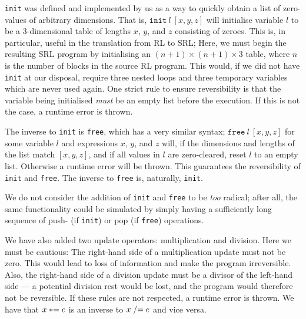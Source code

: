 \texttt{init} was defined and implemented by us as a way to quickly obtain a list of zero-values of arbitrary dimensions. That is, $\texttt{init} \ l \ [x,y,z]$ will initialise variable $l$ to be a 3-dimensional table of lengths $x$, $y$, and $z$ consisting of zeroes. This is, in particular, useful in the translation from RL to SRL; Here, we must begin the resulting SRL program by initialising an $(n+1) \times (n+1) \times 3$ table, where $n$ is the number of blocks in the source RL program. This would, if we did not have \texttt{init} at our disposal, require three nested loops and three temporary variables which are never used again. One strict rule to ensure reversibility is that the variable being initialised \textit{must} be an empty list before the execution. If this is not the case, a runtime error is thrown.

The inverse to \texttt{init} is \texttt{free}, which has a very similar syntax; $\texttt{free} \ l \ [x,y,z]$ for some variable $l$ and expressions $x$, $y$, and $z$ will, if the dimensions and lengths of the list match $[x,y,z]$, and if all values in $l$ are zero-cleared, reset $l$ to an empty list. Otherwise a runtime error will be thrown. This guarantees the reversibility of \texttt{init} and \texttt{free}. The inverse to \texttt{free} is, naturally, \texttt{init}.

We do not consider the addition of \texttt{init} and \texttt{free} to be \textit{too} radical; after all, the same functionality could be simulated by simply having a sufficiently long sequence of push- (if \texttt{init}) or pop (if \texttt{free}) operations.

We have also added two update operators: multiplication and division. Here we must be cautious: The right-hand side of a multiplication update must not be zero. This would lead to loss of information and make the program irreversible. Also, the right-hand side of a division update must be a divisor of the left-hand side --- a potential division rest would be lost, and the program would therefore not be reversible. If these rules are not respected, a runtime error is thrown. We have that $x \mathrel{*}= e$ is an inverse to $x \mathrel{/}= e$ and vice versa.

